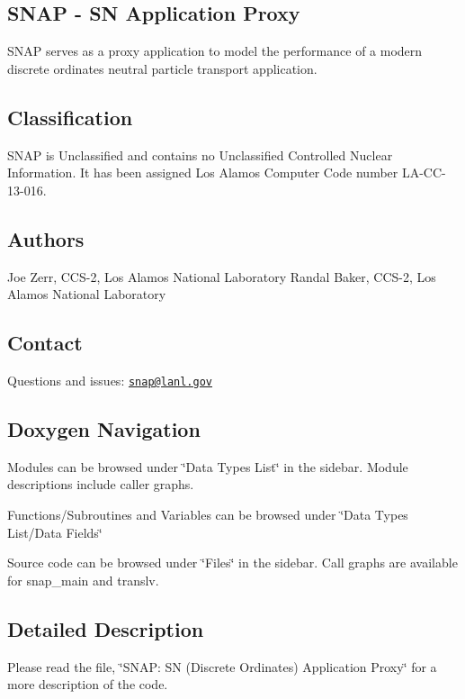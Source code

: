 \subsection*{S\-N\-A\-P -\/ S\-N Application Proxy}

S\-N\-A\-P serves as a proxy application to model the performance of a modern discrete ordinates neutral particle transport application.

\subsection*{Classification}

S\-N\-A\-P is Unclassified and contains no Unclassified Controlled Nuclear Information. It has been assigned Los Alamos Computer Code number L\-A-\/\-C\-C-\/13-\/016.

\subsection*{Authors}

Joe Zerr, C\-C\-S-\/2, Los Alamos National Laboratory Randal Baker, C\-C\-S-\/2, Los Alamos National Laboratory

\subsection*{Contact}

Questions and issues\-: \href{mailto:snap@lanl.gov}{\tt snap@lanl.\-gov}

\subsection*{Doxygen Navigation}

Modules can be browsed under \char`\"{}\-Data Types List\char`\"{} in the sidebar. Module descriptions include caller graphs.

Functions/\-Subroutines and Variables can be browsed under \char`\"{}\-Data Types List/\-Data Fields\char`\"{}

Source code can be browsed under \char`\"{}\-Files\char`\"{} in the sidebar. Call graphs are available for snap\-\_\-main and translv.

\subsection*{Detailed Description}

Please read the file, \char`\"{}\-S\-N\-A\-P\-: S\-N (\-Discrete Ordinates) Application Proxy\char`\"{} for a more description of the code. 